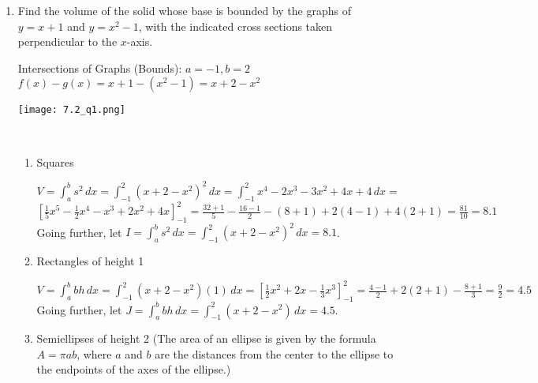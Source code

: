 \documentclass[10pt,letterpaper]{report}
\begin{document}
\begin{enumerate}
  \item{Find the volume of the solid whose base is bounded by the graphs of $y=x+1$ and $y=x^{2}-1$, with the indicated cross sections taken perpendicular to the $x$-axis. \\}
  \begin{multicols}{2}
    Intersections of Graphs (Bounds): $a=-1, b=2$ \\
    
    $f(x)-g(x)=x+1-(x^{2}-1)=x+2-x^{2}$ \\
    
    \vfill\null
    
    \columnbreak
    
    \begin{center}
      \texttt{[image: 7.2\_q1.png]} \\
    \end{center} \\
    \columnbreak
  \end{multicols}
  \begin{enumerate}
    \item{Squares \\}
    
      $V=\int_{a}^{b}{s^{2}}\,dx=\int_{-1}^{2}{\left(x+2-x^{2}\right)^{2}}\,dx=\int_{-1}^{2}{x^{4}-2x^{3}-3x^{2}+4x+4}\,dx=$ \\
      
      $[\frac{1}{5}x^{5}-\frac{1}{2}x^{4}-x^{3}+2x^{2}+4x]_{-1}^{2}=\frac{32+1}{5}-\frac{16-1}{2}-(8+1)+2(4-1)+4(2+1)=\frac{81}{10}=8.1$ \\
      
      Going further, let $I=\int_{a}^{b}{s^{2}}\,dx=\int_{-1}^{2}{\left(x+2-x^{2}\right)^{2}}\,dx=8.1$. \\
      
    \item{Rectangles of height 1 \\}
    
      $V=\int_{a}^{b}{bh}\,dx=\int_{-1}^{2}{(x+2-x^{2})(1)}\,dx=[\frac{1}{2}x^{2}+2x-\frac{1}{3}x^{3}]_{-1}^{2}=\frac{4-1}{2}+2(2+1)-\frac{8+1}{3}=\frac{9}{2}=4.5$ \\
      
      Going further, let $J=\int_{a}^{b}{bh}\,dx=\int_{-1}^{2}{(x+2-x^{2})}\,dx=4.5$. \\
      
    \item{Semiellipses of height 2 (The area of an ellipse is given by the formula $A=\pi ab$, where $a$ and $b$ are the distances from the center to the ellipse to the endpoints of the axes of the ellipse.) \\}
    

\end{enumerate}
\end{enumerate}
\end{document}
